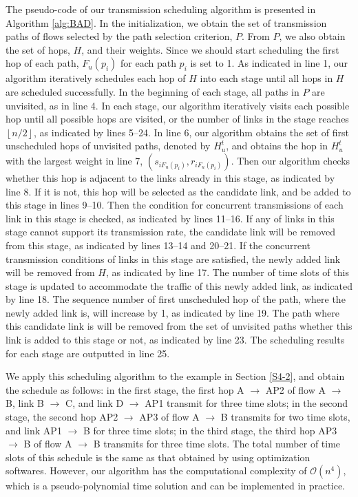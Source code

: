 \documentclass[journal]{IEEEtran}
\begin{document}
The pseudo-code of our transmission scheduling algorithm is presented in Algorithm \ref{alg:BAD}.
In the initialization, we obtain the set of transmission paths of flows selected by the path selection criterion,
$P$. From $P$, we also obtain the set of hops, $H$, and their weights. Since we should start
scheduling the first hop of each path, $F_u(p_i)$ for each path $p_i$ is set to 1. As indicated in
line 1, our algorithm iteratively schedules each hop of $H$ into each stage until all hops in $H$
are scheduled successfully. In the beginning of each stage, all paths in $P$ are unvisited, as in
line 4. In each stage, our algorithm iteratively visits each possible hop until all possible hops
are visited, or the number of links in the stage reaches $\left\lfloor {n/2} \right\rfloor $, as
indicated by lines 5--24. In line 6, our algorithm obtains the set of first unscheduled hops of unvisited
paths, denoted by $H_u^t$, and obtains the hop in $H_u^t$ with the largest weight in
line 7, $(s_{iF_u(p_i)}, r_{iF_u(p_i)})$. Then our algorithm checks whether this hop is adjacent to the links already in this stage,
as indicated by line 8. If it is not, this hop will be selected as the candidate link, and be added
to this stage in lines 9--10. Then the condition for concurrent transmissions of each link in this
stage is checked, as indicated by lines 11--16. If any of links in this stage cannot support its
transmission rate, the candidate link will be removed from this stage, as indicated by lines 13--14
and 20--21. If the concurrent transmission conditions of links in this stage are satisfied, the
newly added link will be removed from $H$, as indicated by line 17. The number of time slots of
this stage is updated to accommodate the traffic of this newly added link, as indicated by line 18.
The sequence number of first unscheduled hop of the path, where the newly added link is, will
increase by 1, as indicated by line 19. The path where this candidate link is will be removed from
the set of unvisited paths whether this link is added to this stage or not, as indicated by line
23. The scheduling results for each stage are outputted in line 25.




We apply this scheduling algorithm to the example in Section \ref{S4-2}, and obtain the schedule as
follows: in the first stage, the first hop A $\to$ AP2 of flow A $\to$ B, link B $\to$ C, and link
D $\to$ AP1 transmit for three time slots; in the second stage, the second hop AP2 $\to$ AP3 of
flow A $\to$ B transmits for two time slots, and link AP1 $\to$ B for three time slots; in the
third stage, the third hop AP3 $\to$ B of flow A $\to$ B transmits for three time slots. The total
number of time slots of this schedule is the same as that obtained by using optimization softwares.
However, our algorithm has the computational complexity of $\mathcal{O}(n^4)$, which is a
pseudo-polynomial time solution and can be implemented in practice.
\end{document}
